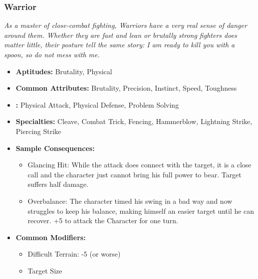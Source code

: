 	\subsubsection{Warrior}\label{Warrior}
		\textit{As a master of close-combat fighting, Warriors have a very real sense of danger around them.
		Whether they are fast and lean or brutally strong fighters does matter little, their posture tell the same story: 
		I am ready to kill you with a spoon, so do not mess with me.}
		\begin{itemize}
			\item \textbf{Aptitudes:} Brutality, Physical
			\item \textbf{Common Attributes:} Brutality, Precision, Instinct, Speed, Toughness
			\item \textbf{:} Physical Attack, Physical Defense, Problem Solving
			\item \textbf{Specialties:} Cleave, Combat Trick, Fencing, Hammerblow, Lightning Strike, Piercing Strike
			\item \textbf{Sample Consequences:} 
			\begin{itemize}
				\item Glancing Hit: While the attack does connect with the target, it is a close call and the character just cannot bring his full power to bear. Target suffers half damage.
				\item Overbalance: The character timed his swing in a bad way and now struggles to keep his balance, making himself an easier target until he can recover. +5 to attack the Character for one turn.
			\end{itemize}
			\item \textbf{Common Modifiers:}
			\begin{itemize}
				\item Difficult Terrain: -5 (or worse)
				\item Target Size
			\end{itemize}
		\end{itemize}


